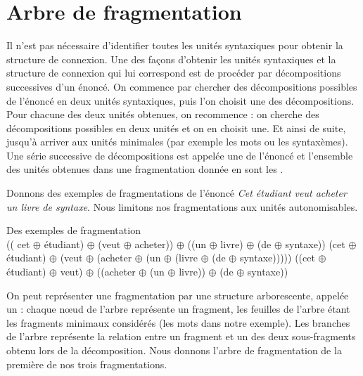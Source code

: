 \section{Arbre de fragmentation}\label{sec:3.2.21}

Il n’est pas nécessaire d’identifier toutes les unités syntaxiques pour obtenir la structure de connexion. Une des façons d’obtenir les unités syntaxiques et la structure de connexion qui lui correspond est de procéder par décompositions successives d’un énoncé. On commence par chercher des décompositions possibles de l’énoncé en deux unités syntaxiques, puis l’on choisit une des décompositions. Pour chacune des deux unités obtenues, on recommence : on cherche des décompositions possibles en deux unités et on en choisit une. Et ainsi de suite, jusqu’à arriver aux unités minimales (par exemple les mots ou les syntaxèmes). Une série successive de décompositions est appelée une  de l’énoncé et l’ensemble des unités obtenues dans une fragmentation donnée en sont les .

Donnons des exemples de fragmentations de l’énoncé \textit{Cet étudiant veut acheter un livre de syntaxe}. Nous limitons nos fragmentations aux unités autonomisables.

\ea Des exemples de fragmentation\\
\ea (( cet ${\oplus}$ étudiant) ${\oplus}$ (veut ${\oplus}$ acheter)) ${\oplus}$ ((un ${\oplus}$ livre) ${\oplus}$ (de ${\oplus}$ syntaxe))\label{ex:fragmentation:1}
\ex (cet ${\oplus}$ étudiant) ${\oplus}$ (veut ${\oplus}$ (acheter ${\oplus}$ (un ${\oplus}$  (livre ${\oplus}$ (de ${\oplus}$ syntaxe)))))
\ex ((cet ${\oplus}$ étudiant) ${\oplus}$  veut) ${\oplus}$ ((acheter ${\oplus}$ (un ${\oplus}$ livre)) ${\oplus}$ (de ${\oplus}$ syntaxe))
\z
\z

On peut représenter une fragmentation par une structure arborescente, appelée un  : chaque nœud de l’arbre représente un fragment, les feuilles de l’arbre étant les fragments minimaux considérés (les mots dans notre exemple). Les branches de l’arbre représente la relation entre un fragment et un des deux sous-fragments obtenu lors de la décomposition. Nous donnons l’arbre de fragmentation de la première de nos trois fragmentations.

